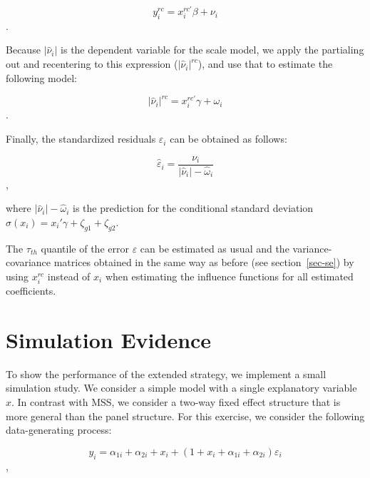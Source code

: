 \documentclass[
  authoryear,
  review,
  1p]{elsarticle}
\begin{document}
\[y_{i}^{rc} = x_{i}^{rc'} \beta + \nu_{i}
\].

Because \(|\hat \nu_i|\) is the dependent variable for the scale model, we
apply the partialing out and recentering to this expression
(\(|\hat \nu_i|^{rc}\)), and use that to estimate the following model:

\[|\hat\nu_{i}|^{rc} = x_{i}^{rc'} \gamma + \omega_{i}\].

Finally, the standardized residuals \(\varepsilon_i\) can be obtained as
follows:

\[\hat{\varepsilon}_{i} = \frac{\nu_{i}}{|\hat\nu_{i}|- \hat \omega_{i}}\],

where \(|\hat\nu_{i}|- \hat \omega_{i}\) is the prediction for the
conditional standard deviation
\(\sigma(x_i)=x_{i}' \gamma + \zeta_{g1} + \zeta_{g2}\).

The \(\tau_{th}\) quantile of the error \(\varepsilon\) can be estimated
as usual and the variance-covariance matrices obtained in the same way
as before (see section~\ref{sec-se}) by using \(x_{i}^{rc}\) instead
of \(x_{i}\) when estimating the influence functions for all estimated
coefficients.

\hypertarget{simulation-evidence}{%
\section{Simulation Evidence}\label{simulation-evidence}}

To show the performance of the extended strategy, we implement a small
simulation study. We consider a simple model with a single explanatory
variable \(x\). In contrast with MSS, we consider a two-way fixed effect
structure that is more general than the panel structure. For this
exercise, we consider the following data-generating process:

\[y_i = \alpha_{1i} + \alpha_{2i} + x_i + (1+x_i + \alpha_{1i} + \alpha_{2i} ) \varepsilon_i
\],
\end{document}

